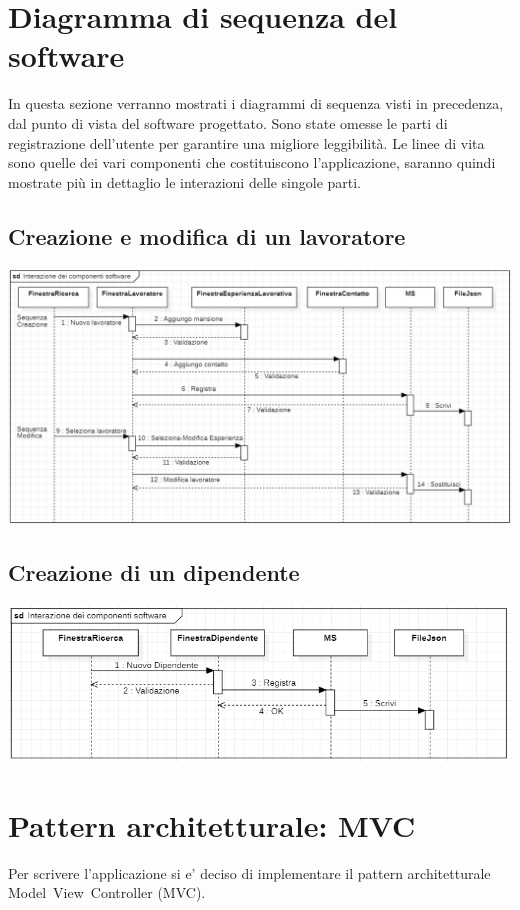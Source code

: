 \documentclass[ 4paper,11pt,openany]{book}
\begin{document}
\section{Diagramma di sequenza del software}
In questa sezione verranno mostrati i diagrammi di sequenza visti in precedenza, dal punto di vista del software progettato. Sono state omesse le parti di registrazione dell'utente per garantire una migliore leggibilità. Le linee di vita sono quelle dei vari componenti che costituiscono l'applicazione, saranno quindi mostrate più in dettaglio le interazioni delle singole parti.
\subsection{Creazione e modifica di un lavoratore}
\includegraphics[width=180mm]{softwareseq.png}
\subsection{Creazione di un dipendente}
\includegraphics[width=180mm]{softwareseq2.png}


\section{Pattern architetturale: MVC}
Per scrivere l'applicazione si e' deciso di implementare il pattern architetturale Model~View~Controller (MVC).
\end{document}
